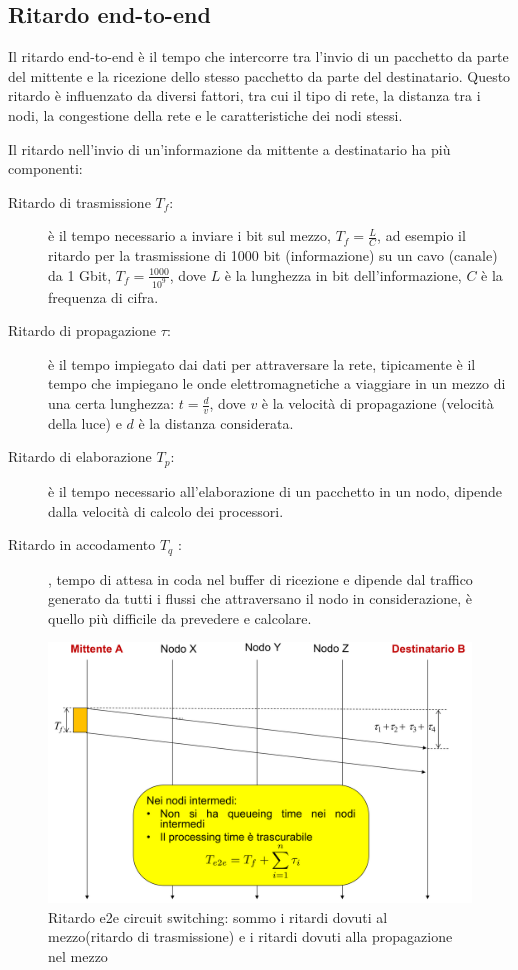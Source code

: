 \subsection{Ritardo end-to-end}
Il ritardo end-to-end è il tempo che intercorre tra l'invio di un pacchetto da parte del mittente e la ricezione dello stesso pacchetto da parte del destinatario. Questo ritardo è influenzato da diversi fattori, tra cui il tipo di rete, la distanza tra i nodi, la congestione della rete e le caratteristiche dei nodi stessi. 

Il ritardo nell'invio di un'informazione da mittente a destinatario ha più componenti:
    \begin{description}
        \item[Ritardo di trasmissione  $T_f$:] è il tempo necessario a inviare i bit sul mezzo, $T_f = \frac{L}{C}$, ad esempio il ritardo per la trasmissione di 1000 bit (informazione) su un cavo (canale) da 1 Gbit, $T_f = \frac{1000}{10^9}$, dove $L$ è la lunghezza in bit dell'informazione, $C$ è la frequenza di cifra.

        \item[Ritardo di propagazione $\tau$:] è il tempo impiegato dai dati per attraversare la rete, tipicamente è il tempo che impiegano le onde elettromagnetiche a viaggiare in un mezzo di una certa lunghezza: $t = \frac{d}{v}$, dove $v$ è la velocità di propagazione (velocità della luce) e $d$ è la distanza considerata.

        \item[Ritardo di elaborazione  $T_p$:] è il tempo necessario all'elaborazione di un pacchetto in un nodo, dipende dalla velocità di calcolo dei processori.

        \item[Ritardo in accodamento $T_q$ :], tempo di attesa in coda nel buffer di ricezione e dipende dal traffico generato da tutti i flussi che attraversano il nodo in considerazione, è quello più difficile da prevedere e calcolare.
    \end{description}
    \begin{figure}[h!]
        \centering
        \includegraphics[width=1\textwidth]{images/e2e_circuit_switching.png}
        \caption{Ritardo e2e circuit switching: sommo i ritardi dovuti al mezzo(ritardo di trasmissione) e i ritardi dovuti alla propagazione nel mezzo}
        \label{fig:circuit_switching}
    \end{figure}
    
